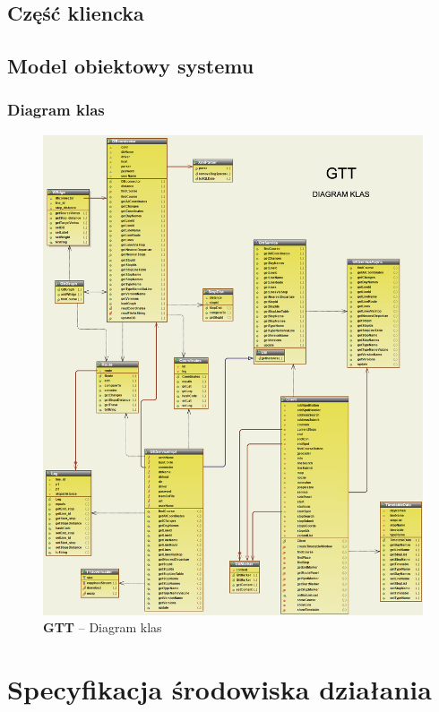 \documentclass[a4paper,12pt]{article}
\begin{document}
\subsection{Część kliencka}

\subsection{Model obiektowy systemu}
\subsubsection{Diagram klas}

 \begin{figure}[htp]
\centering
\includegraphics[width=\textwidth]{diagram_klas} 
\caption{\textbf{GTT} -- Diagram klas}\label{diagram_klas}
\end{figure}
\section{Specyfikacja środowiska działania}
\end{document}
